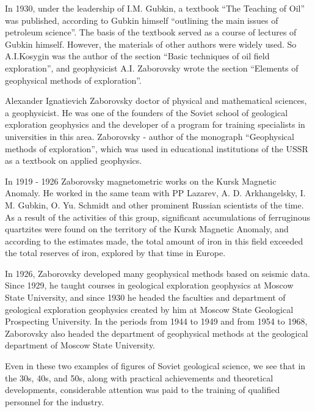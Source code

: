 \documentclass[12pt]{report}
\theoremstyle{definition}
\begin{document}
In 1930, under the leadership of I.M. Gubkin, a textbook ``The Teaching of Oil'' was published, according to Gubkin himself ``outlining the main issues of petroleum science''.
The basis of the textbook served as a course of lectures of Gubkin himself. However, the materials of other authors were widely used.
So A.I.Kosygin was the author of the section ``Basic techniques of oil field exploration'', and geophysicist A.I. Zaborovsky wrote the section ``Elements of geophysical methods of exploration''.

Alexander Ignatievich Zaborovsky doctor of physical and mathematical sciences, a geophysicist.
He was one of the founders of the Soviet school of geological exploration geophysics and the developer of a program for training specialists in universities in this area.
Zaborovsky - author of the monograph ``Geophysical methods of exploration'', which was used in educational institutions of the USSR as a textbook on applied geophysics.

In 1919 - 1926 Zaborovsky magnetometric works on the Kursk Magnetic Anomaly.
He worked in the same team with PP Lazarev, A. D. Arkhangelsky, I. M. Gubkin, O. Yu. Schmidt and other prominent Russian scientists of the time.
As a result of the activities of this group, significant accumulations of ferruginous quartzites were found on the territory of the Kursk Magnetic Anomaly, and according to the estimates made, the total amount of iron in this field exceeded the total reserves of iron, explored by that time in Europe.

In 1926, Zaborovsky developed many geophysical methods based on seismic data.
Since 1929, he taught courses in geological exploration geophysics at Moscow State University, and since 1930 he headed the faculties and department of geological exploration geophysics created by him at Moscow State Geological Prospecting University.
In the periods from 1944 to 1949 and from 1954 to 1968, Zaborovsky also headed the department of geophysical methods at the geological department of Moscow State University.

Even in these two examples of figures of Soviet geological science, we see that in the 30s, 40s, and 50s, along with practical achievements and theoretical developments, considerable attention was paid to the training of qualified personnel for the industry.
\end{document}
